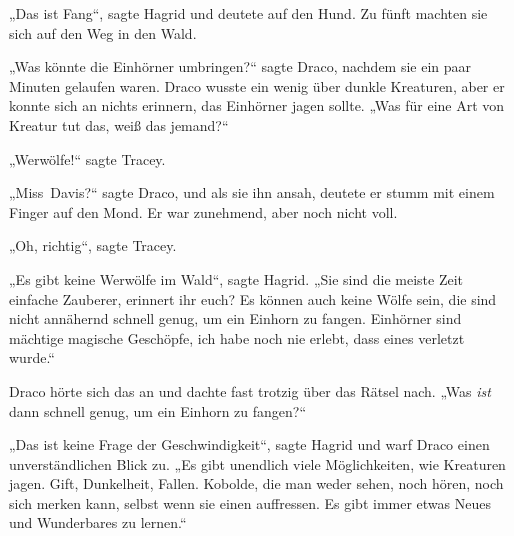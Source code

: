„Das ist Fang“, sagte Hagrid und deutete auf den Hund. Zu fünft machten sie sich auf den Weg in den Wald.

„Was könnte die Einhörner umbringen?“ sagte Draco, nachdem sie ein paar Minuten gelaufen waren. Draco wusste ein wenig über dunkle Kreaturen, aber er konnte sich an nichts erinnern, das Einhörner jagen sollte.
„Was für eine Art von Kreatur tut das, weiß das jemand?“

„Werwölfe!“ sagte Tracey.

„Miss~Davis?“ sagte Draco, und als sie ihn ansah, deutete er stumm mit einem Finger auf den Mond. Er war zunehmend, aber noch nicht voll.

„Oh, richtig“, sagte Tracey.

„Es gibt keine Werwölfe im Wald“, sagte Hagrid.
„Sie sind die meiste Zeit einfache Zauberer, erinnert ihr euch? Es können auch keine Wölfe sein, die sind nicht annähernd schnell genug, um ein Einhorn zu fangen. Einhörner sind mächtige magische Geschöpfe, ich habe noch nie erlebt, dass eines verletzt wurde.“

Draco hörte sich das an und dachte fast trotzig über das Rätsel nach.
„Was \emph{ist} dann schnell genug, um ein Einhorn zu fangen?“

„Das ist keine Frage der Geschwindigkeit“, sagte Hagrid und warf Draco einen unverständlichen Blick zu.
„Es gibt unendlich viele Möglichkeiten, wie Kreaturen jagen. Gift, Dunkelheit, Fallen. Kobolde, die man weder sehen, noch hören, noch sich merken kann, selbst wenn sie einen auffressen. Es gibt immer etwas Neues und Wunderbares zu lernen.“

